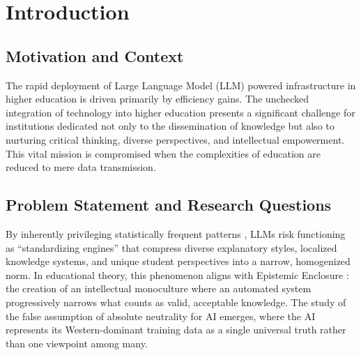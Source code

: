 
\chapter{Introduction}
\section{Motivation and Context}
The rapid deployment of Large Language Model (LLM) powered infrastructure in higher education is driven primarily by efficiency gains. The unchecked integration of technology into higher education presents a significant challenge for institutions dedicated not only to the dissemination of knowledge but also to nurturing critical thinking, diverse perspectives, and intellectual empowerment. This vital mission is compromised when the complexities of education are reduced to mere data transmission.

\section{Problem Statement and Research Questions}
By inherently privileging statistically frequent patterns \cite{Bender2021}, LLMs risk functioning as ``standardizing engines'' that compress diverse explanatory styles, localized knowledge systems, and unique student perspectives into a narrow, homogenized norm. In educational theory, this phenomenon aligns with Epistemic Enclosure \cite{Warren2020}: the creation of an intellectual monoculture where an automated system progressively narrows what counts as valid, acceptable knowledge. The study of the false assumption of absolute neutrality for AI emerges, where the AI represents its Western-dominant training data as a single universal truth rather than one viewpoint among many.

